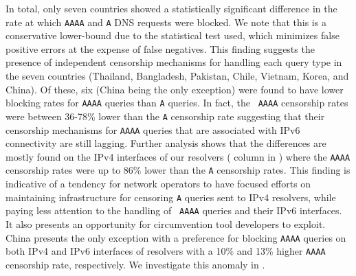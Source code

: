 %
In total, only seven countries showed a statistically significant difference
in the rate at which {\tt AAAA} and {\tt A} DNS requests were blocked. We note
that this is a conservative lower-bound due to the statistical test used, which
minimizes false positive errors at the expense of false negatives.
%
This finding suggests the presence of independent censorship mechanisms for
handling each query type in the seven countries (Thailand, Bangladesh,
Pakistan, Chile, Vietnam, Korea, and China).
%
Of these, six (China being the only exception) were found to have lower
blocking rates for {\tt AAAA} queries than {\tt A} queries. In fact, the {\tt
AAAA} censorship rates were between 36-78\% lower than the {\tt A} censorship
rate suggesting that their censorship mechanisms for {\tt AAAA} queries that
are associated with IPv6 connectivity are still lagging. 
%
Further analysis shows that the differences are mostly found on the IPv4
interfaces of our resolvers ( column in
) where the {\tt AAAA} censorship rates were up to
86\% lower than the {\tt A} censorship rates. 
%
This finding is indicative of a tendency for network operators to have
focused efforts on maintaining infrastructure for censoring {\tt A} queries
sent to IPv4 resolvers, while paying less attention to the handling of {\tt
AAAA} queries and their IPv6 interfaces. It also presents an opportunity for
circumvention tool developers to exploit.
%
China presents the only exception with a preference for blocking
{\tt AAAA} queries on both IPv4 and IPv6 interfaces of resolvers with a 10\%
and 13\% higher {\tt AAAA} censorship rate, respectively. We investigate this
anomaly in .

